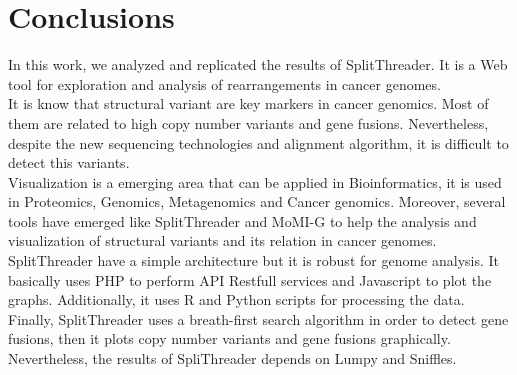 \documentclass{svproc}
\begin{document}
\section{Conclusions} \label{section:conclusions}	

In this work, we analyzed and replicated the results of SplitThreader. It is a Web tool for exploration and analysis of rearrangements in cancer genomes.\\

It is know that structural variant are key markers in cancer genomics. Most of them are related to high copy number variants and gene fusions. Nevertheless, despite the new sequencing technologies and alignment algorithm, it is difficult to detect this variants. \\

Visualization is a emerging area that can be applied in Bioinformatics, it is used in Proteomics, Genomics, Metagenomics and Cancer genomics. Moreover, several tools have emerged like SplitThreader and MoMI-G to help the analysis and visualization of structural variants and its relation in cancer genomes.\\

SplitThreader have a simple architecture but it is robust for genome analysis. It basically uses PHP to perform API Restfull services and Javascript to plot the graphs. Additionally, it uses R and Python scripts for processing the data.\\

Finally, SplitThreader uses a breath-first search algorithm in order to detect gene fusions, then it plots copy number variants and gene fusions graphically. Nevertheless, the results of SpliThreader depends on  Lumpy and Sniffles.   



\end{document}

